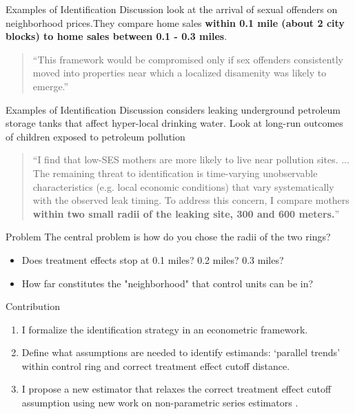 \documentclass[aspectratio=43]{beamer}
\begin{document}
\begin{frame}{Examples of Identification Discussion}
     look at the arrival of sexual offenders on neighborhood prices.They compare home sales \textbf{within 0.1 mile (about 2 city blocks) to home sales between 0.1 - 0.3 miles}. 

    \vspace{2.5mm}
    \begin{quote}
        ``This framework would be compromised only if sex offenders
        consistently moved into properties near which a localized disamenity was likely to emerge.''
    \end{quote}
\end{frame}


\begin{frame}{Examples of Identification Discussion}
     considers leaking underground petroleum storage tanks that affect hyper-local drinking water. Look at long-run outcomes of children exposed to petroleum pollution

    \vspace{2.5mm}
    \begin{quote}
        ``I find that low-SES mothers are more likely to live near pollution sites. ... The remaining threat to identification is time-varying unobservable characteristics (e.g. local economic conditions) that vary systematically with the observed leak timing. To address
        this concern, I compare mothers \textbf{within two small radii of the leaking site, 300 and 600 meters.}''
    \end{quote}
\end{frame}


\begin{frame}{Problem} 
    The central problem is how do you chose the radii of the two rings?

    \begin{itemize}
        \item Does treatment effects stop at 0.1 miles? 0.2 miles? 0.3 miles?
        \item How far constitutes the "neighborhood" that control units can be in?
    \end{itemize}
\end{frame}

\begin{frame}{Contribution}
    \begin{enumerate}
        \item I formalize the identification strategy in an econometric framework.
        
        \item Define what assumptions are needed to identify estimands: `parallel trends' within control ring and correct treatment effect cutoff distance.
        
        \item I propose a new estimator that relaxes the correct treatment effect cutoff assumption using new work on non-parametric series estimators .
    \end{enumerate}
\end{frame}
\end{document}
